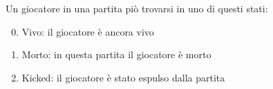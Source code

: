 Un giocatore in una partita piò trovarsi in uno di questi stati:

\begin{enumerate}
	\setcounter{enumi}{-1}
	\item Vivo: il giocatore è ancora vivo
	\item Morto: in questa partita il giocatore è morto
	\item Kicked: il giocatore è stato espulso dalla partita
\end{enumerate}